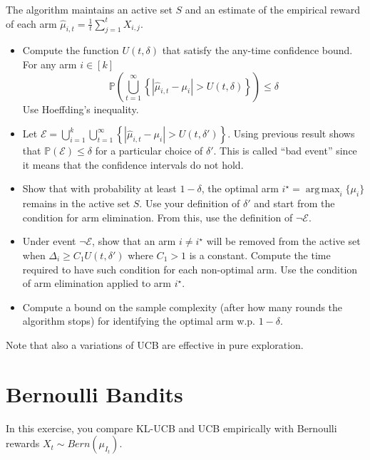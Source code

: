 \documentclass[a4paper]{article}
\newcommand{\wh}[1]{\widehat{#1}}
\DeclareMathOperator*{\argmax}{\arg\,\max}
\begin{document}
The algorithm maintains an active set $S$ and an estimate of the empirical reward of each arm $\wh\mu_{i,t} = \frac{1}{t} \sum_{j=1}^t X_{i,j}$.
\begin{itemize}
    \item Compute the function $U(t,\delta)$ that satisfy the any-time confidence bound. For any arm $i \in [k]$
    \[
        \mathbb{P}\left(\bigcup_{t=1}^{\infty} \left\{ | \wh{\mu}_{i,t} - \mu_i | > U(t,\delta)\right\} \right) \leq \delta
    \]
    Use Hoeffding's inequality.
    \item Let $\mathcal{E} = \bigcup_{i=1}^{k}\bigcup_{t=1}^{\infty} \left\{ | \wh{\mu}_{i,t} - \mu_i | > U(t,\delta')\right\}$. Using previous result shows that $\mathbb{P}(\mathcal{E}) \leq \delta$ for a particular choice of $\delta'$. This is called ``bad event'' since it means that the confidence intervals do not hold.
    \item Show that with probability at least $1-\delta$, the optimal arm $i^\star =\argmax_i \{\mu_{i}\}$ remains in the active set $S$. Use your definition of $\delta'$ and start from the condition for arm elimination. From this, use the definition of $\neg \mathcal{E}$.
    \item Under event $\neg \mathcal{E}$, show that an arm $i \neq i^\star$ will be removed from the active set when $\Delta_i \geq C_1 U(t, \delta')$ where $C_1 > 1$ is a constant. Compute the time required to have such condition for each non-optimal arm. Use the condition of arm elimination applied to arm $i^\star$.
    \item Compute a bound on the sample complexity (after how many rounds the algorithm stops) for identifying the optimal arm w.p. $1-\delta$. 
\end{itemize}

Note that also a variations of UCB are effective in pure exploration.


\section{Bernoulli Bandits}
In this exercise, you compare KL-UCB and UCB empirically with Bernoulli rewards $X_t \sim Bern(\mu_{I_t})$.
\end{document}
